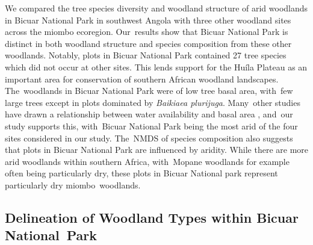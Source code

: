 \documentclass[diversity,article,accept,moreauthors,pdftex]{Definitions/mdpi}
\begin{document}
We compared the tree species diversity and woodland structure of arid woodlands in Bicuar National Park in southwest Angola with three other woodland sites across the miombo ecoregion. Our~results show that Bicuar National Park is distinct in both woodland structure and species composition from these other woodlands. Notably, plots in Bicuar National Park contained 27 tree species which did not occur at other sites. This lends support for the Hu\'{i}la Plateau as an important area for conservation of southern African woodland landscapes. The~woodlands in Bicuar National Park were of low tree basal area, with~few large trees except in plots dominated by \textit{Baikiaea plurijuga}. Many~other studies have drawn a relationship between water availability and basal area \citep{Terra2018, Strickland2016}, and~our study supports this, with~Bicuar National Park being the most arid of the four sites considered in our study. The~NMDS of species composition also suggests that plots in Bicuar National Park are influenced by aridity. While there are more arid woodlands within southern Africa, with~Mopane woodlands for example often being particularly dry, these plots in Bicuar National park represent particularly dry miombo~woodlands.

\subsection{Delineation of Woodland Types within Bicuar National~Park}
\end{document}
